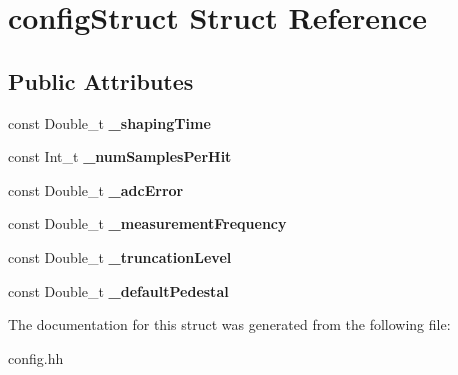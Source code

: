 \hypertarget{structconfig_struct}{}\section{config\+Struct Struct Reference}
\label{structconfig_struct}
\subsection*{Public Attributes}
\begin{DoxyCompactItemize}
\item 
\hypertarget{structconfig_struct_a0a72bf4313b6abfb95720f8cfb216db1}{}const Double\+\_\+t {\bfseries \+\_\+shaping\+Time}\label{structconfig_struct_a0a72bf4313b6abfb95720f8cfb216db1}

\item 
\hypertarget{structconfig_struct_a34e7c38148c1be09d4e21af0bc68f4e7}{}const Int\+\_\+t {\bfseries \+\_\+num\+Samples\+Per\+Hit}\label{structconfig_struct_a34e7c38148c1be09d4e21af0bc68f4e7}

\item 
\hypertarget{structconfig_struct_a3397c4c837f37280e72a70430a08ef31}{}const Double\+\_\+t {\bfseries \+\_\+adc\+Error}\label{structconfig_struct_a3397c4c837f37280e72a70430a08ef31}

\item 
\hypertarget{structconfig_struct_a9b7440a7fc98326acf56b68ad55fb6bf}{}const Double\+\_\+t {\bfseries \+\_\+measurement\+Frequency}\label{structconfig_struct_a9b7440a7fc98326acf56b68ad55fb6bf}

\item 
\hypertarget{structconfig_struct_a3a41c207546ee3ba389999edf0e8b860}{}const Double\+\_\+t {\bfseries \+\_\+truncation\+Level}\label{structconfig_struct_a3a41c207546ee3ba389999edf0e8b860}

\item 
\hypertarget{structconfig_struct_aa36def027da2244c3d880e6f8d15c3f1}{}const Double\+\_\+t {\bfseries \+\_\+default\+Pedestal}\label{structconfig_struct_aa36def027da2244c3d880e6f8d15c3f1}

\end{DoxyCompactItemize}


The documentation for this struct was generated from the following file\+:\begin{DoxyCompactItemize}
\item 
config.\+hh\end{DoxyCompactItemize}
